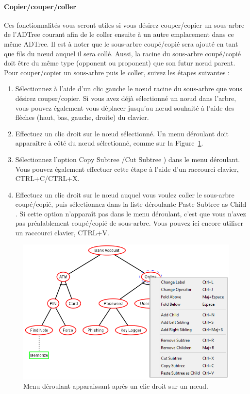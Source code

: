 \paragraph{Copier/couper/coller} Ces fonctionnalités vous seront utiles si vous désirez couper/copier un sous-arbre de l'ADTree courant afin de le coller ensuite à un autre emplacement dans ce même ADTree. Il est à noter que le sous-arbre coupé/copié sera ajouté en tant que fils du n\oe{}ud auquel il sera collé. Aussi, la racine du sous-arbre coupé/copié doit être du même type (opponent ou proponent) que son futur n\oe{}ud parent. Pour couper/copier un sous-arbre puis le coller, suivez les étapes suivantes : 
\begin{enumerate}
    \item Sélectionnez à l'aide d'un clic gauche le n\oe{}ud racine du sous-arbre que vous désirez couper/copier. Si vous avez déjà sélectionné un n\oe{}ud dans l'arbre, vous pouvez également vous déplacer jusqu'au n\oe{}ud souhaité à l'aide des flèches (haut, bas, gauche, droite) du clavier.
	\item Effectuez un clic droit sur le n\oe{}ud sélectionné. Un menu déroulant doit apparaître à côté du n\oe{}ud sélectionné, comme sur la {\sc Figure}~\ref{fig:clicdroit}.
	\item Sélectionnez l'option \og Copy Subtree \fg{}/\og Cut Subtree \fg{}) dans le menu déroulant. Vous pouvez également effectuer cette étape à l'aide d'un raccourci clavier, {\sc CTRL+C}/{\sc CTRL+X}.
	\item Effectuez un clic droit sur le n\oe{}ud auquel vous voulez coller le sous-arbre coupé/copié, puis sélectionnez dans la liste déroulante \og Paste Subtree as Child \fg{}. Si cette option n'apparaît pas dans le menu déroulant, c'est que vous n'avez pas préalablement coupé/copié de sous-arbre. Vous pouvez ici encore utiliser un raccourci clavier, {\sc CTRL+V}.
\end{enumerate}

    \begin{figure}[H]
        \centering
        \includegraphics[height=0.63\textwidth]{figure/clicdroit.png}
        \caption{Menu déroulant apparaissant après un clic droit sur un n\oe{}ud.}
        \label{fig:clicdroit}
    \end{figure}

